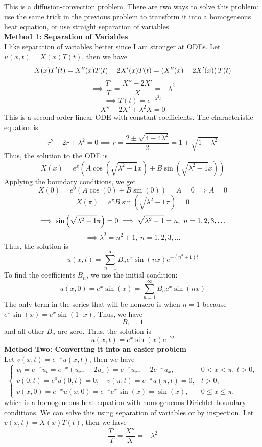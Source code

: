 \documentclass[12pt]{article}
\begin{document}
\sol
This is a diffusion-convection problem. There are two ways to solve this problem: use the same trick in the previous problem to transform it into a homogeneous heat equation, or use straight separation of variables. \\
\textbf{Method 1: Separation of Variables}\\
I like separation of variables better since I am stronger at ODEs. Let $u(x,t) = X(x)T(t)$, then we have
\[
X(x) T'(t) = X''(x) T(t) - 2 X'(x) T(t) = \left( X''(x) -2X'(x) \right)T(t)
\]
\[
\implies
\frac{T'}{T} = \frac{X'' - 2X'}{X} = -\lambda^2
\]
\[
\implies T(t) = e^{-\lambda^2 t}
\]
\[
X'' - 2X' + \lambda^2 X = 0
\]
This is a second-order linear ODE with constant coefficients. The characteristic equation is
\[
r^2 - 2r + \lambda^2 = 0
\implies r = \frac{2 \pm \sqrt{4-4\lambda^2}}{2} = 1 \pm \sqrt{1-\lambda^2}
\]
Thus, the solution to the ODE is
\[
X(x) = e^x \left(A \cos\left(\sqrt{\lambda^2 - 1} x\right) + B \sin\left(\sqrt{\lambda^2 - 1} x\right)\right)
\]
Applying the boundary conditions, we get
\[
X(0) = e^0 (A \cos(0) + B \sin(0)) = A = 0 \implies A = 0
\]
\[
X(\pi) = e^\pi B \sin\left(\sqrt{\lambda^2 - 1} \pi\right) = 0 
\]
\[
\implies \sin \left( \sqrt{\lambda^2-1}\pi \right) = 0 \implies \sqrt{\lambda^2 - 1} = n, \ n = 1,2,3,\dots
\]
\[
\implies \lambda^2 = n^2 + 1, \ n = 1,2,3,\dots
\]
Thus, the solution is
\[
u(x,t) = \sum_{n=1}^\infty B_n e^x \sin(nx) e^{-(n^2 + 1) t}
\]
To find the coefficients $B_n$, we use the initial condition:
\[
u(x,0) = e^x \sin(x) = \sum_{n=1}^\infty B_n e^x \sin(nx)
\]
The only term in the series that will be nonzero is when $n=1$ because $e^x \sin(x) = e^x \sin(1 \cdot x)$. Thus, we have
\[
B_1 = 1
\]
and all other $B_n$ are zero. Thus, the solution is
\[
\boxed{
u(x,t) = e^x \sin(x) e^{-2t}
}
\]
\textbf{Method Two: Converting it into an easier problem}\\
Let $v(x,t) = e^{-x} u(x,t)$, then we have
\[
\begin{cases}
v_t = e^{-x} u_t = e^{-x} (u_{xx} - 2u_x) = e^{-x} u_{xx} - 2 e^{-x} u_x, & 0 < x < \pi,\ t > 0, \\
v(0,t) = e^0 u(0,t) = 0,\quad v(\pi,t) = e^{-\pi} u(\pi,t) = 0, & t > 0, \\
v(x,0) = e^{-x} u(x,0) = e^{-x} e^x \sin(x) = \sin(x), & 0 \leq x \leq \pi,
\end{cases}
\]
which is a homogeneous heat equation with homogeneous Dirichlet boundary conditions. We can solve this using separation of variables or by inspection. Let $v(x,t) = X(x)T(t)$, then we have
\[
\frac{T'}{T} = \frac{X''}{X} = -\lambda^2
\]
\end{document}
